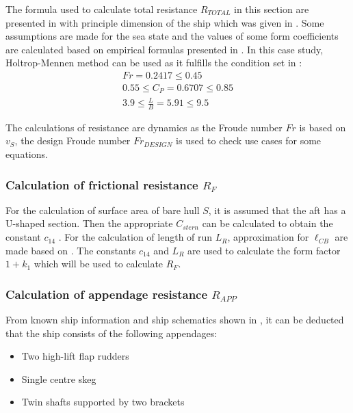 The formula used to calculate total resistance $R_{TOTAL}$ in this section are presented in  with principle dimension of the ship which was given in . Some assumptions are made for the sea state and the values of some form coefficients are calculated based on empirical formulas presented in . In this case study, Holtrop-Mennen method can be used as it fulfills the condition set in :
\begin{equation}
    \label{eqn:holtrop_cond_fulfill}
    \begin{gathered}
        Fr = 0.2417  \leqslant 0.45 \\
        0.55 \leqslant C_P = 0.6707 \leqslant 0.85 \\
        3.9 \leqslant \frac{L}{B} = 5.91 \leqslant 9.5
    \end{gathered}
\end{equation}

The calculations of resistance are dynamics as the Froude number $Fr$ is based on $v_S$, the design Froude number $Fr_{DESIGN}$ is used to check use cases for some equations.

\subsubsection*{Calculation of frictional resistance $R_F$}

For the calculation of surface area of bare hull $S$, it is assumed that the aft has a U-shaped section. Then the appropriate $C_{stern}$ can be calculated to obtain the constant $c_{14}$ . For the calculation of length of run $L_R$, approximation for $\ell_{CB}$ are made based on . The constants $c_{14}$ and $L_R$ are used to calculate the form factor $1+k_1$ which will be used to calculate $R_F$.

\subsubsection*{Calculation of appendage resistance $R_{APP}$}

From known ship information and ship schematics shown in , it can be deducted that the ship consists of the following appendages:

\begin{itemize}
    \setlength\itemsep{0em}
    \item Two high-lift flap rudders
    \item Single centre skeg
    \item Twin shafts supported by two brackets
\end{itemize}

